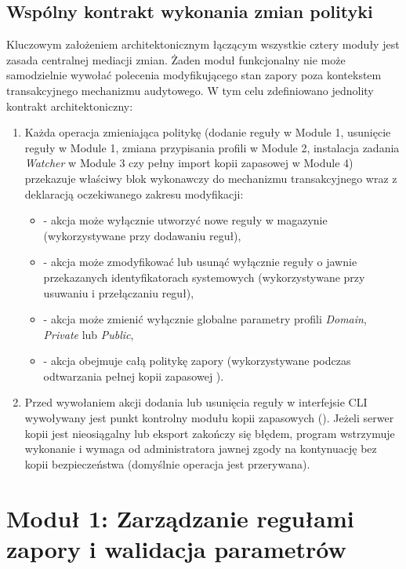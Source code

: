 \subsection{Wspólny kontrakt wykonania zmian polityki}\label{subsec:przeplyw-sterowania}

Kluczowym założeniem architektonicznym łączącym wszystkie cztery moduły jest zasada centralnej mediacji zmian. Żaden moduł funkcjonalny nie może samodzielnie wywołać polecenia modyfikującego stan zapory poza kontekstem transakcyjnego mechanizmu audytowego. W tym celu zdefiniowano jednolity kontrakt architektoniczny:
\begin{enumerate}
    \item Każda operacja zmieniająca politykę (dodanie reguły w Module 1, usunięcie reguły w Module 1, zmiana przypisania profili w Module 2, instalacja zadania \textit{Watcher} w Module 3 czy pełny import kopii zapasowej w Module 4) przekazuje właściwy blok wykonawczy do mechanizmu transakcyjnego wraz z deklaracją oczekiwanego zakresu modyfikacji:
    \begin{itemize}
        \item {} - akcja może wyłącznie utworzyć nowe reguły w magazynie (wykorzystywane przy dodawaniu reguł),
        \item {} - akcja może zmodyfikować lub usunąć wyłącznie reguły o jawnie przekazanych identyfikatorach systemowych (wykorzystywane przy usuwaniu i przełączaniu reguł),
        \item {} - akcja może zmienić wyłącznie globalne parametry profili \textit{Domain}, \textit{Private} lub \textit{Public},
        \item {} - akcja obejmuje całą politykę zapory (wykorzystywane podczas odtwarzania pełnej kopii zapasowej ).
    \end{itemize}
    \item Przed wywołaniem akcji dodania lub usunięcia reguły w interfejsie CLI wywoływany jest punkt kontrolny modułu kopii zapasowych (). Jeżeli serwer kopii jest nieosiągalny lub eksport zakończy się błędem, program wstrzymuje wykonanie i wymaga od administratora jawnej zgody na kontynuację bez kopii bezpieczeństwa (domyślnie operacja jest przerywana).
\end{enumerate}

\section{Moduł 1: Zarządzanie regułami zapory i walidacja parametrów}\label{sec:modul-reguly}

